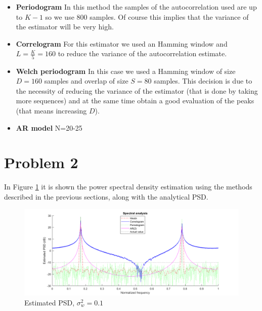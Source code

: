 \documentclass[a4paper, 12pt]{report}
\begin{document}
\begin{itemize}
	
\item {\bf Periodogram} In this method the samples of the autocorrelation used are up to $K-1$ so we use 800 samples. Of course this implies that the variance of the estimator will be very high.

\item {\bf Correlogram}  For this estimator we used an Hamming window and $L=\frac{K}{5}=160$ to reduce the variance of the autocorrelation estimate.

\item {\bf Welch periodogram} In this case we used a Hamming window of size $D=160$ samples and overlap of size $S=80$ samples. This decision is due to the necessity of reducing the variance of the estimator (that is done by taking more sequences) and at the same time obtain a good evaluation of the peaks (that means increasing $D$).

\item {\bf AR model} N=20-25   %

\end{itemize}

\section*{Problem 2}
In Figure \ref{fig:estimatedpsd01} it is shown the power spectral density estimation using the methods described in the previous sections, along with the analytical PSD.

\begin{figure}[H]
	\centering
	\includegraphics[width=1\textwidth]{estimatedpsd01}
	\caption{Estimated PSD, $\sigma_w^2 = 0.1$}
	\label{fig:estimatedpsd01}
\end{figure}
\end{document}
